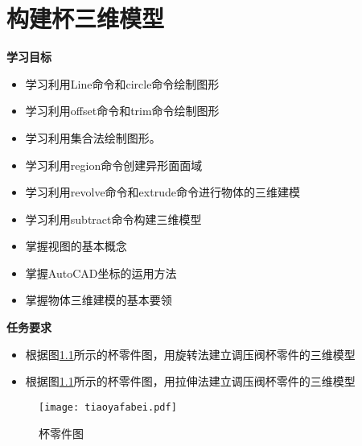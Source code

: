 \chapter{构建杯三维模型}\label{chap:bei}

{\bfseries 学习目标}
\begin{itemize}
\item 学习利用Line命令和circle命令绘制图形
\item 学习利用offset命令和trim命令绘制图形
\item 学习利用集合法绘制图形。
\item 学习利用region命令创建异形面面域
\item 学习利用revolve命令和extrude命令进行物体的三维建模
\item 学习利用subtract命令构建三维模型
\item 掌握视图的基本概念
\item 掌握AutoCAD坐标的运用方法
\item 掌握物体三维建模的基本要领
\end{itemize}

{\bfseries 任务要求}
\begin{itemize}
\item 根据图\ref{fig:tiaoyafabei}所示的杯零件图，用旋转法建立调压阀杯零件的三维模型
\item 根据图\ref{fig:tiaoyafabei}所示的杯零件图，用拉伸法建立调压阀杯零件的三维模型
\end{itemize}

\begin{figure}[htbp]
\centering
\texttt{[image: tiaoyafabei.pdf]}
\caption{杯零件图}\label{fig:tiaoyafabei}
\end{figure}
\clearpage







\endinput